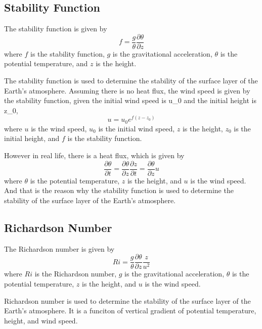 \documentclass{article}
\begin{document}
\subsection{Stability Function}

The stability function is given by
\begin{equation}
f = \frac{g}{\theta} \frac{\partial \theta}{\partial z}
\end{equation}
where $f$ is the stability function, $g$ is the gravitational acceleration, $\theta$ is the potential temperature, and $z$ is the height.

The stability function is used to determine the stability of the surface layer of the Earth's atmosphere. 
Assuming there is no heat flux, the wind speed is given by the stability function, given the initial wind speed is u_{0} and the initial height is z_{0},
\begin{equation}
u = u_{0} e^{f (z - z_{0})}
\end{equation}
where $u$ is the wind speed, $u_{0}$ is the initial wind speed, $z$ is the height, $z_{0}$ is the initial height, and $f$ is the stability function.

However in real life, there is a heat flux, which is given by
\begin{equation}
\frac{\partial \theta}{\partial t} = \frac{\partial \theta}{\partial z} \frac{\partial z}{\partial t} = \frac{\partial \theta}{\partial z} u
\end{equation}
where $\theta$ is the potential temperature, $z$ is the height, and $u$ is the wind speed.
And that is the reason why the stability function is used to determine the stability of the surface layer of the Earth's atmosphere.

\subsection{Richardson Number}
The Richardson number is given by 
\begin{equation}
Ri = \frac{g}{\theta} \frac{\partial \theta}{\partial z} \frac{z}{u^2}
\end{equation}
where $Ri$ is the Richardson number, $g$ is the gravitational acceleration, $\theta$ is the potential temperature, $z$ is the height, and $u$ is the wind speed.

Richardson number is used to determine the stability of the surface layer of the Earth's atmosphere. It is a funciton of vertical gradient of potential temperature, height, and wind speed.
\end{document}
